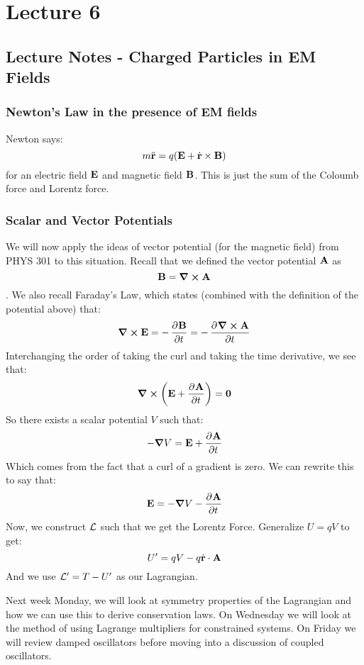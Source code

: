 \documentclass[../PHYS306Notes.tex]{subfiles}
\begin{document}
\section{Lecture 6}
\subsection{Lecture Notes - Charged Particles in EM Fields}
\subsubsection{Newton's Law in the presence of EM fields}
Newton says:
\[m\ddot{\mathbf{r}} = q(\mathbf{E} + \dot{\mathbf{r}}\times \mathbf{B})\] for an electric field $\mathbf{E}$ and magnetic field $\mathbf{B}$. This is just the sum of the Coloumb force and Lorentz force.

\subsubsection{Scalar and Vector Potentials}
We will now apply the ideas of vector potential (for the magnetic field) from PHYS 301 to this situation. Recall that we defined the vector potential $\mathbf{A}$ as \[\mathbf{B} = \curl{\ensuremath{\mathbf{A}}}\].
We also recall Faraday's Law, which states (combined with the definition of the potential above) that:
\[\curl{\v{E}} = -\dpd{\v{B}}{t} = -\dpd{\curl{\v{A}}}{t}\]
Interchanging the order of taking the curl and taking the time derivative, we see that:
\[\curl{\left(\v{E} + \dpd{\v{A}}{t}\right)} = \v{0}\]
So there exists a scalar potential $V$ such that:
\[-\grad{V} = \v{E} + \dpd{\v{A}}{t}\]
Which comes from the fact that a curl of a gradient is zero. We can rewrite this to say that:
\[\v{E} = -\grad{V} - \dpd{\v{A}}{t}\]
Now, we construct $\mathcal{L}$ such that we get the Lorentz Force. Generalize $U = qV$ to get:
\[U' = qV - q\dot{\mathbf{r}}\cdot\mathbf{A}\]
And we use $\mathcal{L}' = T - U'$ as our Lagrangian.

Next week Monday, we will look at symmetry properties of the Lagrangian and how we can use this to derive conservation laws. On Wednesday we will look at the method of using Lagrange multipliers for constrained systems. On Friday we will review damped oscillators before moving into a discussion of coupled oscillators.
\end{document}
